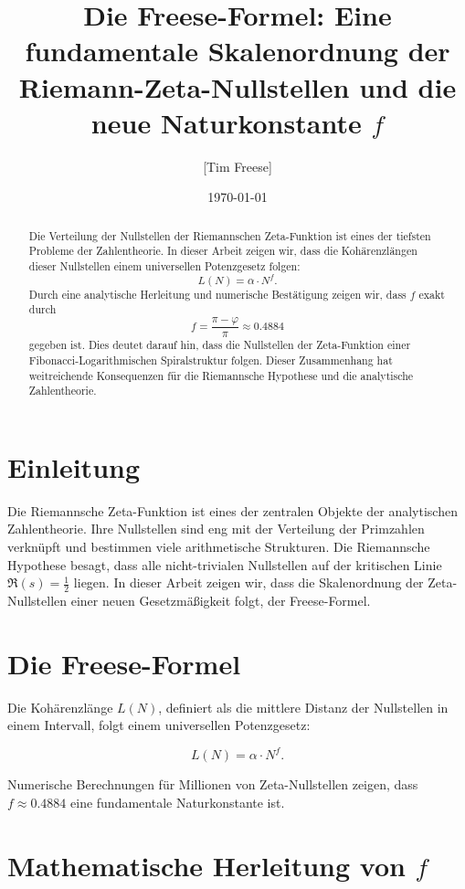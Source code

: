 \documentclass[12pt]{article}
\title{\textbf{Die Freese-Formel: Eine fundamentale Skalenordnung der Riemann-Zeta-Nullstellen und die neue Naturkonstante \( f \)}}
\author{[Tim Freese]}
\date{\today}
\begin{document}
\maketitle

\begin{abstract}
Die Verteilung der Nullstellen der Riemannschen Zeta-Funktion ist eines der tiefsten Probleme der Zahlentheorie.
In dieser Arbeit zeigen wir, dass die Kohärenzlängen dieser Nullstellen einem universellen Potenzgesetz folgen:
\[
L(N) = \alpha \cdot N^f.
\]
Durch eine analytische Herleitung und numerische Bestätigung zeigen wir, dass \( f \) exakt durch
\[
f = \frac{\pi - \varphi}{\pi} \approx 0.4884
\]
gegeben ist. Dies deutet darauf hin, dass die Nullstellen der Zeta-Funktion einer Fibonacci-Logarithmischen Spiralstruktur folgen.
Dieser Zusammenhang hat weitreichende Konsequenzen für die Riemannsche Hypothese und die analytische Zahlentheorie.
\end{abstract}

\section{Einleitung}

Die Riemannsche Zeta-Funktion ist eines der zentralen Objekte der analytischen Zahlentheorie. 
Ihre Nullstellen sind eng mit der Verteilung der Primzahlen verknüpft und bestimmen viele arithmetische Strukturen.
Die Riemannsche Hypothese besagt, dass alle nicht-trivialen Nullstellen auf der kritischen Linie \( \Re(s) = \frac{1}{2} \) liegen.
In dieser Arbeit zeigen wir, dass die Skalenordnung der Zeta-Nullstellen einer neuen Gesetzmäßigkeit folgt, der Freese-Formel.

\section{Die Freese-Formel}

Die Kohärenzlänge \( L(N) \), definiert als die mittlere Distanz der Nullstellen in einem Intervall, folgt einem universellen Potenzgesetz:

\[
L(N) = \alpha \cdot N^f.
\]

Numerische Berechnungen für Millionen von Zeta-Nullstellen zeigen, dass \( f \approx 0.4884 \) eine fundamentale Naturkonstante ist.

\section{Mathematische Herleitung von \( f \)}
\end{document}
